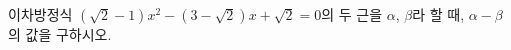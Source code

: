 이차방정식 $(\sqrt{2}-1)x^2-(3-\sqrt{2})x+\sqrt{2}=0$의 두 근을 $\alpha$, $\beta$라 할 때, $\alpha-\beta$의 값을 구하시오. \cond{$\alpha>\beta$}
